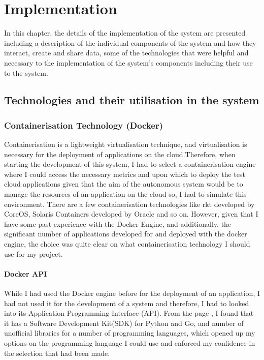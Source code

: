 \chapter{Implementation}\label{ch:implementation}
In this chapter, the details of the implementation of the system are presented including a description of the individual  components of the system and how they interact, create and share data, some of the technologies that were helpful and necessary to the implementation of the system's components including their use to the system.

\section{Technologies and their utilisation in the system}
\subsection{Containerisation Technology (Docker)}
Containerisation\cite{pahl2017cloud} is a lightweight virtualisation technique, and virtualisation is necessary for the deployment of applications on the cloud.Therefore, when starting the development of this system, I had to select a containerisation engine where I could access the necessary metrics and upon which to deploy the test cloud applications given that the aim of the autonomous system would be to manage the resources of an application on the cloud so, I had to simulate this environment. There are a few containerisation technologies like rkt\cite{rkt} developed by CoreOS, Solaris Containers\cite{solaris} developed by Oracle and so on. However, given that I have some past experience with the Docker Engine, and additionally, the significant number of applications developed for and deployed with the docker engine, the choice was quite clear on what containerisation technology I should use for my project.
\subsubsection{Docker API}
While I had used the Docker engine before for the deployment of an application, I had not used it for the development of a system and therefore, I had to looked into its Application Programming Interface (API). From the page \cite{dockerAPI}, I found that it has a Software Development Kit(SDK) for Python and Go, and number of unofficial libraries for a number of programming languages, which opened up my options on the programming language I could use and enforced my confidence in the selection that had been made.
